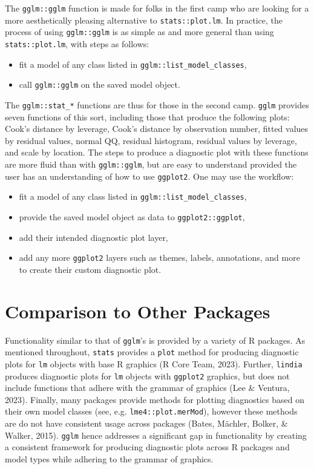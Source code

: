 \documentclass[10pt,a4paper,onecolumn]{article}
\providecommand{\tightlist}{%
  \setlength{\itemsep}{0pt}\setlength{\parskip}{0pt}}
\begin{document}
The \texttt{gglm::gglm} function is made for folks in the first camp who
are looking for a more aesthetically pleasing alternative to
\texttt{stats::plot.lm}. In practice, the process of using
\texttt{gglm::gglm} is as simple as and more general than using
\texttt{stats::plot.lm}, with steps as follows:

\begin{itemize}
\tightlist
\item
  fit a model of any class listed in
  \texttt{gglm::list\_model\_classes},
\item
  call \texttt{gglm::gglm} on the saved model object.
\end{itemize}

The \texttt{gglm::stat\_*} functions are thus for those in the second
camp. \texttt{gglm} provides seven functions of this sort, including
those that produce the following plots: Cook's distance by leverage,
Cook's distance by observation number, fitted values by residual values,
normal QQ, residual histogram, residual values by leverage, and scale by
location. The steps to produce a diagnostic plot with these functions
are more fluid than with \texttt{gglm::gglm}, but are easy to understand
provided the user has an understanding of how to use \texttt{ggplot2}.
One may use the workflow:

\begin{itemize}
\tightlist
\item
  fit a model of any class listed in
  \texttt{gglm::list\_model\_classes},
\item
  provide the saved model object as data to \texttt{ggplot2::ggplot},
\item
  add their intended diagnostic plot layer,
\item
  add any more \texttt{ggplot2} layers such as themes, labels,
  annotations, and more to create their custom diagnostic plot.
\end{itemize}

\hypertarget{comparison-to-other-packages}{%
\section{Comparison to Other
Packages}\label{comparison-to-other-packages}}

Functionality similar to that of \texttt{gglm}'s is provided by a
variety of R packages. As mentioned throughout, \texttt{stats} provides
a \texttt{plot} method for producing diagnostic plots for \texttt{lm}
objects with base R graphics (R Core Team, 2023). Further,
\texttt{lindia} produces diagnostic plots for \texttt{lm} objects with
\texttt{ggplot2} graphics, but does not include functions that adhere
with the grammar of graphics (Lee \& Ventura, 2023). Finally, many
packages provide methods for plotting diagnostics based on their own
model classes (see, e.g. \texttt{lme4::plot.merMod}), however these
methods are do not have consistent usage across packages (Bates,
Mächler, Bolker, \& Walker, 2015). \texttt{gglm} hence addresses a
significant gap in functionality by creating a consistent framework for
producing diagnostic plots across R packages and model types while
adhering to the grammar of graphics.
\end{document}
